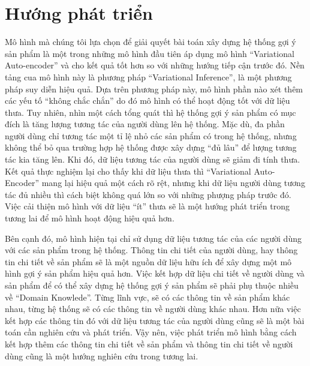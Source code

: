 \section{Hướng phát triển}
Mô hình mà chúng tôi lựa chọn để giải quyết bài toán xây dựng hệ thống gợi ý sản phẩm là một trong những mô hình đầu tiên áp dụng mô hình ``Variational Auto-encoder'' và cho kết quả tốt hơn so với những hướng tiếp cận trước đó.
Nền tảng cua mô hình này là phương pháp ``Variational Inference'', là một phương pháp suy diễn hiệu quả.
Dựa trên phương pháp này, mô hình phần nào xét thêm các yếu tố ``không chắc chắn'' do đó mô hình có thể hoạt động tốt với dữ liệu thưa.
Tuy nhiên, nhìn một cách tổng quát thì hệ thống gợi ý sản phẩm có mục đích là tăng lượng tương tác của người dùng lên hệ thống.
Mặc dù, đa phần người dùng chỉ tương tác một tỉ lệ nhỏ các sản phẩm có trong hệ thống, nhưng không thể bỏ qua trường hợp hệ thống được xây dựng ``đủ lâu'' để lượng tương tác kia tăng lên.
Khi đó, dữ liệu tương tác của người dùng sẽ giảm đi tính thưa. 
Kết quả thực nghiệm lại cho thấy khi dữ liệu thưa thì ``Variational Auto-Encoder'' mang lại hiệu quả một cách rõ rệt,
nhưng khi dữ liệu người dùng tương tác đủ nhiều thì cách biệt không quá lớn so với những phượng pháp trước đó.
Việc cải thiện mô hình với dữ liệu ``ít'' thưa sẽ là một hướng phát triển trong tương lai để mô hình hoạt động hiệu quả hơn.

Bên cạnh đó, mô hình hiện tại chỉ sử dụng dữ liệu tương tác của các người dùng với các sản phẩm trong hệ thống.
Thông tin chi tiết của người dùng, hay thông tin chi tiết về sản phẩm sẽ là một nguồn dữ liệu hữu ích để xây dựng một mô hình gợi ý sản phẩm hiệu quả hơn. 
Việc kết hợp dữ liệu chi tiết về người dùng và sản phẩm để có thể xây dựng hệ thống gợi ý sản phẩm sẽ phải phụ thuộc nhiều về ``Domain Knowlede''.
Từng lĩnh vực, sẽ có các thông tin về sản phẩm khác nhau, từng hệ thống sẽ có các thông tin về người dùng khác nhau.
Hơn nữa việc kết hợp các thông tin đó với dữ liệu tương tác của người dùng cũng sẽ là một bài toán cần nghiên cứu và phát triển.
Vậy nên, việc phát triển mô hình bằng cách kết hợp thêm các thông tin chi tiết về sản phẩm và thông tin chi tiết về người dùng cũng là một hướng nghiên cứu trong tương lai.
